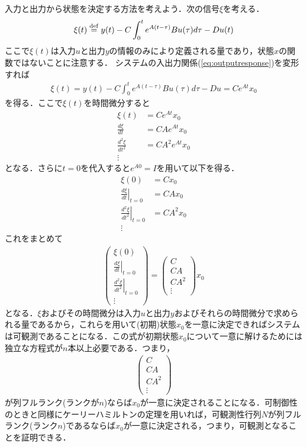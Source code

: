 入力と出力から状態を決定する方法を考えよう．次の信号$\xi$を考える．
\begin{align}
 \xi(t) \stackrel{\rm def}{=} y(t) -  C\int_0^t e^{A(t-\tau)} B u (\tau) d \tau - D u(t)
\end{align}
ここで$\xi(t)$は入力$u$と出力$y$の情報のみにより定義される量であり，状態$x$の関数ではないことに注意する．
システムの入出力関係(\ref{eq:outputresponse})を変形すれば
\begin{align}
 \xi(t) = y(t) -  C\int_0^t e^{A(t-\tau)} B u (\tau) d \tau - D u= Ce^{At} x_0 
\end{align}
を得る．ここで$\xi(t)$を時間微分すると
\begin{align}
 \xi(t) &= C e^{At} x_0
\nonumber \\
 \frac{d \xi}{dt} & = C A e^{At} x_0
\nonumber \\
 \frac{d^2 \xi}{dt^2} &= C A^2 e^{At} x_0
\\
 \vdots
\nonumber 
\end{align}
となる．さらに$t=0$を代入すると$e^{A0}=I$を用いて以下を得る．
\begin{align}
 \xi(0) &= C x_0
\nonumber \\
 \left. \frac{d \xi}{dt} \right \vert_{t=0} & = C A  x_0
\nonumber \\
 \left. \frac{d^2 \xi}{dt^2} \right \vert_{t=0}&= C A^2  x_0
\\
 \vdots
\nonumber
\end{align}
これをまとめて
\begin{align}
 \left( 
    \begin{array}{c}
       \xi(0) \\
       \left . \frac{d \xi}{dt} \right \vert_{t=0} \\
       \left . \frac{d^2 \xi}{dt^2} \right \vert_{t=0}\\
       \vdots
    \end{array}
 \right)
 =
 \left( 
    \begin{array}{c}
       C \\
       C A \\
       C A^2 \\
       \vdots
    \end{array}
 \right)
 x_0
\end{align}
となる．$\xi$およびその時間微分は入力$u$と出力$y$およびそれらの時間微分で求められる量であるから，これらを用いて(初期)状態$x_0$を一意に決定できればシステムは可観測であることになる．この式が初期状態$x_0$について一意に解けるためには独立な方程式が$n$本以上必要である．つまり，
\begin{align}
 \left( 
    \begin{array}{c}
       C \\
       C A \\
       C A^2 \\
       \vdots
    \end{array}
 \right)
\end{align}
が列フルランク(ランクが$n$)ならば$x_0$が一意に決定されることになる．可制御性のときと同様にケーリーハミルトンの定理を用いれば，可観測性行列$N$が列フルランク(ランク$n$)であるならば$x_0$が一意に決定される，つまり，可観測となることを証明できる．

